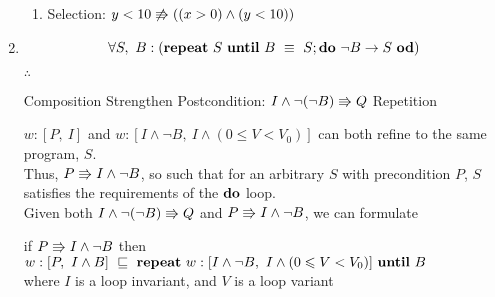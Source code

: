 \documentclass{article}
\begin{document}
\begin{enumerate}
\begin{enumerate}
    \item 
        \DERIVE
        \hint{\doesntrefsto} {Selection: $y < 10 \not\Rrightarrow ((x > 0) \land (y < 10))$}

        \ENDDERIVE
    \end{enumerate}
\item

    \[\forall S,\ B : (\Repeat\ S\ \Until\ B ~\equiv~ S; \Do\ \neg B \rightarrow S\ \Od)\]

    $\therefore$

    \DERIVE
     {Composition}
     {Strengthen Postcondition: $I \land \neg(\neg B) \Rrightarrow Q$}
     {Repetition}
    \ENDDERIVE

    $w: [P,\ I]$ and $w:[I \land \neg B,\ I \land (0 \leqslant V < V_0)]$ can both refine to the same program, $S$.\\

    Thus, $P \Rrightarrow I \land \neg B$, so such that for an arbitrary $S$ with precondition $P$, $S$ satisfies the requirements of the ${\bf do}$ loop.\\

    Given both $I \land \neg(\neg B) \Rrightarrow Q$ and $P \Rrightarrow I \land \neg B$, we can formulate\\

    \begin{center}
    if $P \Rrightarrow I \land \neg B$ then $w:[P,\ I \land B] ~\refsto~ \Repeat\ w:[I \land \neg B,\ I \land (0 \leqslant V < V_0)]\ \Until\ B$\\
    where $I$ is a loop invariant, and $V$ is a loop variant
    \end{center}

\end{enumerate}




\end{document}
